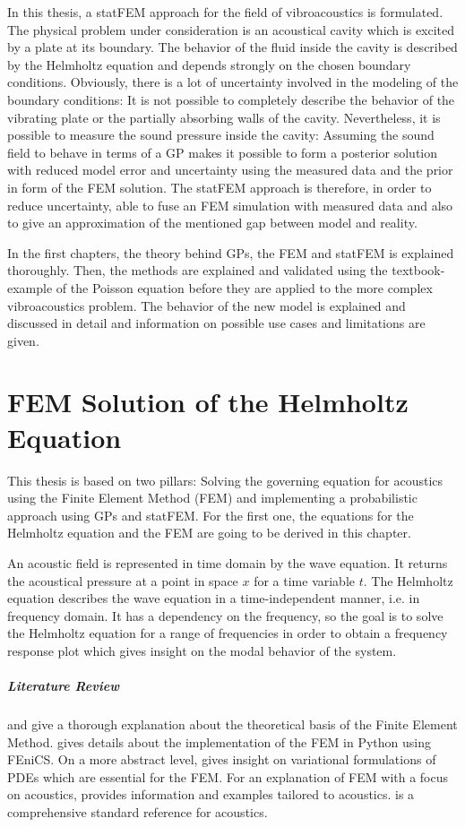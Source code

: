 \documentclass[%
  a4paper,oneside,%
  11pt,%
  smallchapters,
  style=printdev,
  extramargin,
  green,%
  rgb, <cmyk>
  ]{tubsbook}
\begin{document}
In this thesis, a statFEM approach for the field of vibroacoustics is formulated. The physical problem under consideration is an acoustical cavity which is excited by a plate at its boundary. The behavior of the fluid inside the cavity is described by the Helmholtz equation and depends strongly on the chosen boundary conditions. Obviously, there is a lot of uncertainty involved in the modeling of the boundary conditions: It is not possible to completely describe the behavior of the vibrating plate or the partially absorbing walls of the cavity. Nevertheless, it is possible to measure the sound pressure inside the cavity: Assuming the sound field to behave in terms of a GP makes it possible to form a posterior solution with reduced model error and uncertainty using the measured data and the prior in form of the FEM solution. The statFEM approach is therefore, in order to reduce uncertainty, able to fuse an FEM simulation with measured data and also to give an approximation of the mentioned gap between model and reality.

In the first chapters, the theory behind GPs, the FEM and statFEM is explained thoroughly. Then, the methods are explained and validated using the textbook-example of the Poisson equation before they are applied to the more complex vibroacoustics problem. The behavior of the new model is explained and discussed in detail and information on possible use cases and limitations are given.


\chapter{FEM Solution of the Helmholtz Equation}
This thesis is based on two pillars: Solving the governing equation for acoustics using the Finite Element Method (FEM) and implementing a probabilistic approach using GPs and statFEM. For the first one, the equations for the Helmholtz equation and the FEM are going to be derived in this chapter.

An acoustic field is represented in time domain by the wave equation. It returns the acoustical pressure at a point in space $x$ for a time variable $t$.
The Helmholtz equation describes the wave equation in a time-independent manner, i.e. in frequency domain. It has a dependency on the frequency, so the goal is to solve the Helmholtz equation for a range of frequencies in order to obtain a frequency response plot which gives insight on the modal behavior of the system.

\paragraph{Literature Review}
\cite{langtangen2019} and \cite{larson2013} give a thorough explanation about the theoretical basis of the Finite Element Method. \cite{langtangen2016} gives details about the implementation of the FEM in Python using FEniCS. On a more abstract level, \cite{Lanczos1986} gives insight on variational formulations of PDEs which are essential for the FEM. For an explanation of FEM with a focus on acoustics, \cite{atalla2015} provides information and examples tailored to acoustics. \cite{moser2005} is a comprehensive standard reference for acoustics. 
\end{document}
